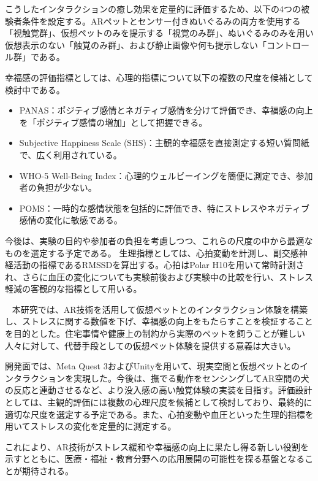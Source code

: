 \documentclass[a4j]{ltjsarticle}
\newcounter{seccnt}
\newcommand{\usection}[1]{\ \newline{\bf\underline{\theseccnt\stepcounter{seccnt}. #1}\hspace{10pt}}}
\begin{document}
こうしたインタラクションの癒し効果を定量的に評価するため、以下の4つの被験者条件を設定する。ARペットとセンサー付きぬいぐるみの両方を使用する「視触覚群」、仮想ペットのみを提示する「視覚のみ群」、ぬいぐるみのみを用い仮想表示のない「触覚のみ群」、および静止画像や何も提示しない「コントロール群」である。

幸福感の評価指標としては、心理的指標について以下の複数の尺度を候補として検討中である。

\begin{itemize}
    \item PANAS：ポジティブ感情とネガティブ感情を分けて評価でき、幸福感の向上を「ポジティブ感情の増加」として把握できる。
    \item Subjective Happiness Scale (SHS)：主観的幸福感を直接測定する短い質問紙で、広く利用されている。
    \item WHO-5 Well-Being Index：心理的ウェルビーイングを簡便に測定でき、参加者の負担が少ない。
    \item POMS：一時的な感情状態を包括的に評価でき、特にストレスやネガティブ感情の変化に敏感である。
\end{itemize}

今後は、実験の目的や参加者の負担を考慮しつつ、これらの尺度の中から最適なものを選定する予定である。
生理指標としては、心拍変動を計測し、副交感神経活動の指標であるRMSSDを算出する。心拍はPolar H10を用いて常時計測され、さらに血圧の変化についても実験前後および実験中の比較を行い、ストレス軽減の客観的な指標として用いる。


\usection{まとめ}
本研究では、AR技術を活用して仮想ペットとのインタラクション体験を構築し、ストレスに関する数値を下げ、幸福感の向上をもたらすことを検証することを目的とした。住宅事情や健康上の制約から実際のペットを飼うことが難しい人々に対して、代替手段としての仮想ペット体験を提供する意義は大きい。

開発面では、Meta Quest 3およびUnityを用いて、現実空間と仮想ペットとのインタラクションを実現した。今後は、撫でる動作をセンシングしてAR空間の犬の反応と連動させるなど、より没入感の高い触覚体験の実装を目指す。評価設計としては、主観的評価には複数の心理尺度を候補として検討しており、最終的に適切な尺度を選定する予定である。また、心拍変動や血圧といった生理的指標を用いてストレスの変化を定量的に測定する。

これにより、AR技術がストレス緩和や幸福感の向上に果たし得る新しい役割を示すとともに、医療・福祉・教育分野への応用展開の可能性を探る基盤となることが期待される。
\end{document}
